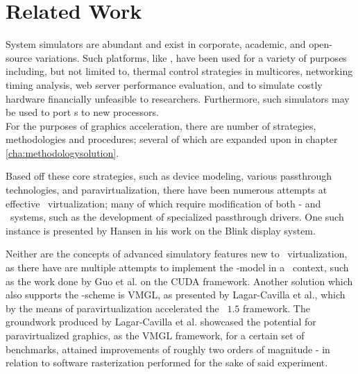 
\chapter{Related Work}
\label{cha:relatedwork}
System simulators are abundant and exist in corporate, academic, and open-source variations.
Such platforms, like \dvttermsimics , have been used for a variety of purposes including, but not limited to, thermal control strategies in multicores, networking timing analysis, web server performance evaluation, and to simulate costly hardware financially unfeasible to researchers.
Furthermore, such simulators may be used to port \dvttermos s to new processors.\\

\noindent
For the purposes of graphics acceleration, there are number of strategies, methodologies and procedures; several of which are expanded upon in chapter \ref{cha:methodologysolution}.

Based off these core strategies, such as device modeling, various passthrough technologies, and paravirtualization, there have been numerous attempts at effective \dvttermgpu\ virtualization; many of which require modification of both \dvttermtarget - and \dvttermhost\ systems, such as the development of specialized passthrough drivers.
One such instance is presented by Hansen in his work on the Blink display system.

Neither are the concepts of advanced simulatory features new to \dvttermgpu\ virtualization, as there have are multiple attempts to implement the \dvttermcheckpointrestart -model in a \dvttermgpu\ context, such as the work done by Guo et al. on the CUDA framework.
Another solution which also supports the \dvttermcheckpointrestart -scheme is VMGL, as presented by Lagar-Cavilla et al., which by the means of paravirtualization accelerated the \dvttermopengl\ $1.5$ framework.
The groundwork produced by Lagar-Cavilla et al. showcased the potential for paravirtualized graphics, as the VMGL framework, for a certain set of benchmarks, attained improvements of roughly two orders of magnitude - in relation to software rasterization performed for the sake of said experiment.

